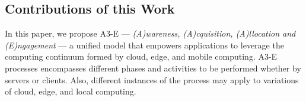 

%


\subsection*{Contributions of this Work}


In this paper, we propose A3-E --- \textit{(A)wareness, (A)cquisition, (A)llocation and (E)ngagement} --- a unified model that empowers applications to leverage the computing continuum formed by cloud, edge, and mobile computing. A3-E processes encompasses different phases and activities to be performed whether by servers or clients. Also, different instances of the process may apply to variations of cloud, edge, and local computing.

